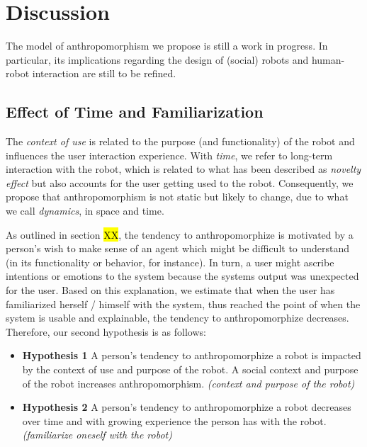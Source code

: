 \documentclass{frontiersSCNS} %
\begin{document}
%
%
%
%
%
%


\section{Discussion}
\label{sec:discussion}

The model of anthropomorphism we propose is still a work in progress. In
particular, its implications regarding the design of (social) robots and
human-robot interaction are still to be refined.

\subsection{Effect of Time and Familiarization}


The \textit{context of use} is related to the purpose (and functionality) of the
robot and influences the user interaction experience. With \textit{time}, we
refer to long-term interaction with the robot, which is related to what has been
described as \textit{novelty effect} but also accounts for the user getting used
to the robot. Consequently, we propose that anthropomorphism is not static but
likely to change, due to what we call \textit{dynamics}, in space and time.


As outlined in section \hl{XX}, the tendency to anthropomorphize is motivated by
a person's wish to make sense of an agent which might be difficult to understand
(in its functionality or behavior, for instance). In turn, a user might ascribe
intentions or emotions to the system because the systems output was unexpected
for the user. Based on this explanation, we estimate that when the user has
familiarized herself / himself with the system, thus reached the point of when
the system is usable and explainable, the tendency to anthropomorphize
decreases. Therefore, our second hypothesis is as follows: 

\begin{itemize}
    \item \textbf{Hypothesis 1} A person's tendency to anthropomorphize a robot
        is impacted by the context of use and purpose of the robot. A social
        context and purpose of the robot increases anthropomorphism.
        \textit{(context and purpose of the robot)}
	\item \textbf{Hypothesis 2} A person's tendency to anthropomorphize a robot decreases over time and with growing experience the person has with the robot. \textit{(familiarize oneself with the robot)}
\end{itemize}
\end{document}
